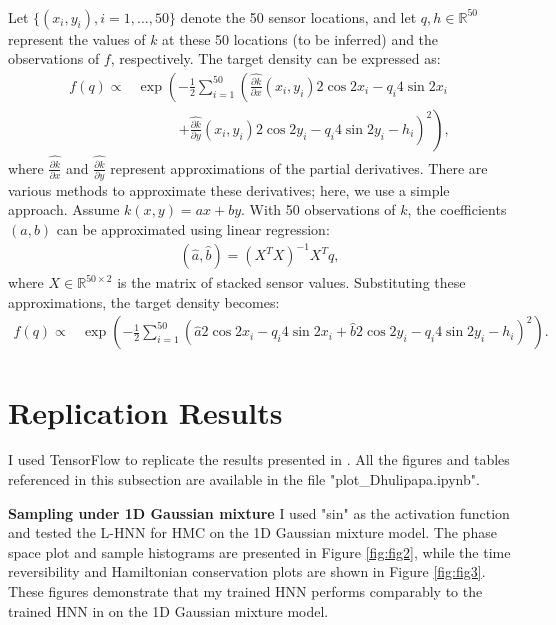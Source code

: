 \documentclass[11pt,a4paper]{article}
\theoremstyle{remark}
\begin{document}
\begin{itemize}
\begin{align*}
\end{align*}
Let $\{(x_i, y_i), i = 1, \dots, 50\}$ denote the 50 sensor locations, and let $q, h \in \mathbb{R}^{50}$ represent the values of $k$ at these 50 locations (to be inferred) and the observations of $f$, respectively. The target density can be expressed as:
\begin{align}
    f(q) \propto & \exp\left( - \frac{1}{2} \sum_{i=1}^{50} \left( \hat{\frac{\partial k}{\partial x}}(x_i, y_i) 2\cos 2x_i - q_i 4\sin 2x_i \right.\right. \nonumber \\
    & \qquad \quad \left.\left. + \hat{\frac{\partial k}{\partial y}}(x_i, y_i) 2\cos 2y_i - q_i 4\sin 2y_i - h_i \right)^2 \right),
\end{align}
where $\hat{\frac{\partial k}{\partial x}}$ and $\hat{\frac{\partial k}{\partial y}}$ represent approximations of the partial derivatives. There are various methods to approximate these derivatives; here, we use a simple approach. Assume $k(x, y) = ax + by$. With 50 observations of $k$, the coefficients $(a, b)$ can be approximated using linear regression:
\begin{align}
    (\hat{a}, \hat{b}) = (X^T X)^{-1} X^T q,
\end{align}
where $X \in \mathbb{R}^{50 \times 2}$ is the matrix of stacked sensor values. Substituting these approximations, the target density becomes:
\begin{align}
    f(q) \propto & \exp\left( - \frac{1}{2} \sum_{i=1}^{50} \left( \hat{a} 2\cos 2x_i - q_i 4\sin 2x_i + \hat{b} 2\cos 2y_i - q_i 4\sin 2y_i - h_i \right)^2 \right).
\end{align}
\end{itemize}

\section{Replication Results}
I used TensorFlow to replicate the results presented in \cite{dhulipala2023efficient}. All the figures and tables referenced in this subsection are available in the file "plot\_Dhulipapa.ipynb".

\smallskip 
\noindent \textbf{Sampling under 1D Gaussian mixture} I used "sin" as the activation function and tested the L-HNN for HMC on the 1D Gaussian mixture model. The phase space plot and sample histograms are presented in Figure \ref{fig:fig2}, while the time reversibility and Hamiltonian conservation plots are shown in Figure \ref{fig:fig3}. These figures demonstrate that my trained HNN performs comparably to the trained HNN in \cite{dhulipala2023efficient} on the 1D Gaussian mixture model.
\end{document}
